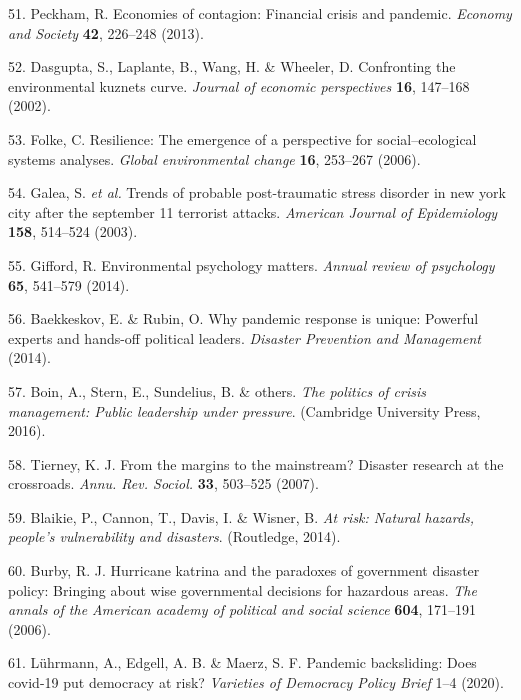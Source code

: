 \documentclass[]{article}
\begin{document}
\begin{cslreferences}
\leavevmode\hypertarget{ref-peckham2013economies}{}%
51. Peckham, R. Economies of contagion: Financial crisis and pandemic. \emph{Economy and Society} \textbf{42}, 226--248 (2013).

\leavevmode\hypertarget{ref-dasgupta2002confronting}{}%
52. Dasgupta, S., Laplante, B., Wang, H. \& Wheeler, D. Confronting the environmental kuznets curve. \emph{Journal of economic perspectives} \textbf{16}, 147--168 (2002).

\leavevmode\hypertarget{ref-folke2006resilience}{}%
53. Folke, C. Resilience: The emergence of a perspective for social--ecological systems analyses. \emph{Global environmental change} \textbf{16}, 253--267 (2006).

\leavevmode\hypertarget{ref-galea2003trends}{}%
54. Galea, S. \emph{et al.} Trends of probable post-traumatic stress disorder in new york city after the september 11 terrorist attacks. \emph{American Journal of Epidemiology} \textbf{158}, 514--524 (2003).

\leavevmode\hypertarget{ref-gifford2014environmental}{}%
55. Gifford, R. Environmental psychology matters. \emph{Annual review of psychology} \textbf{65}, 541--579 (2014).

\leavevmode\hypertarget{ref-baekkeskov2014pandemic}{}%
56. Baekkeskov, E. \& Rubin, O. Why pandemic response is unique: Powerful experts and hands-off political leaders. \emph{Disaster Prevention and Management} (2014).

\leavevmode\hypertarget{ref-boin2016politics}{}%
57. Boin, A., Stern, E., Sundelius, B. \& others. \emph{The politics of crisis management: Public leadership under pressure}. (Cambridge University Press, 2016).

\leavevmode\hypertarget{ref-tierney2007margins}{}%
58. Tierney, K. J. From the margins to the mainstream? Disaster research at the crossroads. \emph{Annu. Rev. Sociol.} \textbf{33}, 503--525 (2007).

\leavevmode\hypertarget{ref-blaikie2014risk}{}%
59. Blaikie, P., Cannon, T., Davis, I. \& Wisner, B. \emph{At risk: Natural hazards, people's vulnerability and disasters}. (Routledge, 2014).

\leavevmode\hypertarget{ref-burby2006hurricane}{}%
60. Burby, R. J. Hurricane katrina and the paradoxes of government disaster policy: Bringing about wise governmental decisions for hazardous areas. \emph{The annals of the American academy of political and social science} \textbf{604}, 171--191 (2006).

\leavevmode\hypertarget{ref-luhrmann2020}{}%
61. Lührmann, A., Edgell, A. B. \& Maerz, S. F. Pandemic backsliding: Does covid-19 put democracy at risk? \emph{Varieties of Democracy Policy Brief} 1--4 (2020).


\end{cslreferences}
\end{document}
